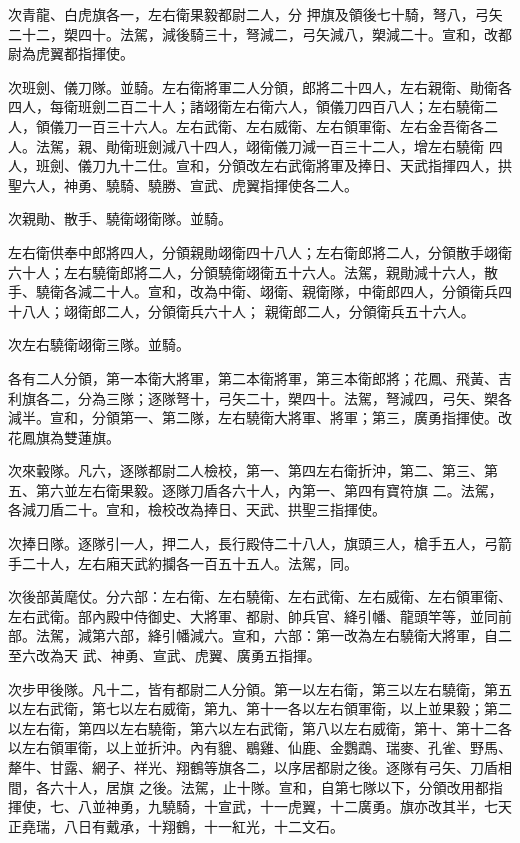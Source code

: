 \begin{pinyinscope}
 次青龍、白虎旗各一，左右衛果毅都尉二人，分
 押旗及領後七十騎，弩八，弓矢二十二，槊四十。法駕，減後騎三十，弩減二，弓矢減八，槊減二十。宣和，改都尉為虎翼都指揮使。



 次班劍、儀刀隊。並騎。左右衛將軍二人分領，郎將二十四人，左右親衛、勛衛各四人，每衛班劍二百二十人；諸翊衛左右衛六人，領儀刀四百八人；左右驍衛二人，領儀刀一百三十六人。左右武衛、左右威衛、左右領軍衛、左右金吾衛各二人。法駕，親、勛衛班劍減八十四人，翊衛儀刀減一百三十二人，增左右驍衛
 四人，班劍、儀刀九十二仕。宣和，分領改左右武衛將軍及捧日、天武指揮四人，拱聖六人，神勇、驍騎、驍勝、宣武、虎翼指揮使各二人。



 次親勛、散手、驍衛翊衛隊。並騎。



 左右衛供奉中郎將四人，分領親勛翊衛四十八人；左右衛郎將二人，分領散手翊衛六十人；左右驍衛郎將二人，分領驍衛翊衛五十六人。法駕，親勛減十六人，散手、驍衛各減二十人。宣和，改為中衛、翊衛、親衛隊，中衛郎四人，分領衛兵四十八人；翊衛郎二人，分領衛兵六十人；
 親衛郎二人，分領衛兵五十六人。



 次左右驍衛翊衛三隊。並騎。



 各有二人分領，第一本衛大將軍，第二本衛將軍，第三本衛郎將；花鳳、飛黃、吉利旗各二，分為三隊；逐隊弩十，弓矢二十，槊四十。法駕，弩減四，弓矢、槊各減半。宣和，分領第一、第二隊，左右驍衛大將軍、將軍；第三，廣勇指揮使。改花鳳旗為雙蓮旗。



 次來轂隊。凡六，逐隊都尉二人檢校，第一、第四左右衛折沖，第二、第三、第五、第六並左右衛果毅。逐隊刀盾各六十人，內第一、第四有寶符旗
 二。法駕，各減刀盾二十。宣和，檢校改為捧日、天武、拱聖三指揮使。



 次捧日隊。逐隊引一人，押二人，長行殿侍二十八人，旗頭三人，槍手五人，弓箭手二十人，左右廂天武約攔各一百五十五人。法駕，同。



 次後部黃麾仗。分六部：左右衛、左右驍衛、左右武衛、左右威衛、左右領軍衛、左右武衛。部內殿中侍御史、大將軍、都尉、帥兵官、絳引幡、龍頭竿等，並同前部。法駕，減第六部，絳引幡減六。宣和，六部：第一改為左右驍衛大將軍，自二至六改為天
 武、神勇、宣武、虎翼、廣勇五指揮。



 次步甲後隊。凡十二，皆有都尉二人分領。第一以左右衛，第三以左右驍衛，第五以左右武衛，第七以左右威衛，第九、第十一各以左右領軍衛，以上並果毅；第二以左右衛，第四以左右驍衛，第六以左右武衛，第八以左右威衛，第十、第十二各以左右領軍衛，以上並折沖。內有貔、鶡雞、仙鹿、金鸚鵡、瑞麥、孔雀、野馬、犛牛、甘露、網子、祥光、翔鶴等旗各二，以序居都尉之後。逐隊有弓矢、刀盾相間，各六十人，居旗
 之後。法駕，止十隊。宣和，自第七隊以下，分領改用都指揮使，七、八並神勇，九驍騎，十宣武，十一虎翼，十二廣勇。旗亦改其半，七天正堯瑞，八日有戴承，十翔鶴，十一紅光，十二文石。




\end{pinyinscope}
